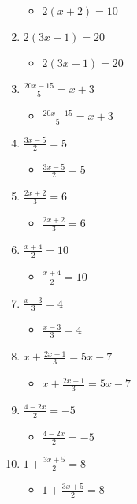 \begin{enumerate}
  \begin{itemize}
  \item $2(x+2)=10$
  \end{itemize}
\item $2(3x+1)=20$
  \begin{itemize}
  \item $2(3x+1)=20$
  \end{itemize}
\item {\Large $\frac{20x-15}{5}=x+3$}
  \begin{itemize}
  \item {\Large $\frac{20x-15}{5}=x+3$}
  \end{itemize}
\item {\Large $\frac{3x-5}{2}=5$}
  \begin{itemize}
  \item {\Large $\frac{3x-5}{2}=5$}
  \end{itemize}
\item {\Large $\frac{2x+2}{3}=6$}
  \begin{itemize}
  \item {\Large $\frac{2x+2}{3}=6$}
  \end{itemize}
\item {\Large $\frac{x+4}{2}=10$}
  \begin{itemize}
  \item {\Large $\frac{x+4}{2}=10$}
  \end{itemize}
\item {\Large $\frac{x-3}{3}=4$}
  \begin{itemize}
  \item {\Large $\frac{x-3}{3}=4$}
  \end{itemize}
\item {\Large $x+\frac{2x-1}{3}=5x-7$}
  \begin{itemize}
  \item {\Large $x+\frac{2x-1}{3}=5x-7$}
  \end{itemize}
\item {\Large $\frac{4-2x}{2}=-5$}
  \begin{itemize}
  \item {\Large $\frac{4-2x}{2}=-5$}
  \end{itemize}
\item {\Large $1+\frac{3x+5}{2}=8$}
  \begin{itemize}
  \item {\Large $1+\frac{3x+5}{2}=8$}

\end{itemize}
\end{enumerate}
